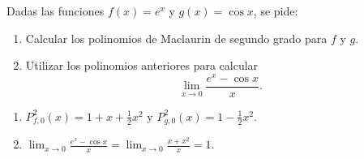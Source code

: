 {Dadas las funciones
$f(x)=e^x$ y $g(x)=\cos x$, se pide:
\begin{enumerate}
   \item  Calcular los polinomios de Maclaurin de segundo grado para $f$
   y $g$.

   \item  Utilizar los polinomios anteriores para calcular
   \[ \lim_{x\rightarrow 0}\frac{e^x-\cos x}{x}.\]
\end{enumerate}
}
{\begin{enumerate}
\item $P^2_{f,0}(x) = 1+x+\frac{1}{2}x^2$ y $P^2_{g,0}(x) = 1-\frac{1}{2}x^2$.
\item $\lim_{x\rightarrow 0}\frac{e^x-\cos x}{x} = \lim_{x\rightarrow 0}\frac{x+x^2}{x} = 1$.
\end{enumerate}
}
{
}


